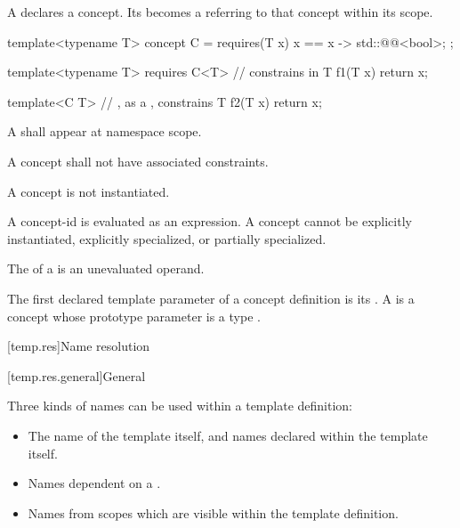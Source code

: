 \pnum
A 
declares a concept.
Its  becomes a 
referring to that concept
within its scope.
\begin{example}
\begin{codeblock}
template<typename T>
concept C = requires(T x) {
  { x == x } -> std::@@<bool>;
};

template<typename T>
  requires C<T>     //  constrains  in 
T f1(T x) { return x; }

template<C T>       // , as a , constrains 
T f2(T x) { return x; }
\end{codeblock}
\end{example}

\pnum
A 
shall appear at namespace scope.

\pnum
A concept shall not have associated constraints.

\pnum
A concept is not instantiated.
\begin{note}
A concept-id is evaluated as an expression.
A concept cannot be
explicitly instantiated,
explicitly specialized,
or partially specialized.
\end{note}

\pnum
The  of a 
is an unevaluated operand.

\pnum
The first declared template parameter of a concept definition is its
.
%
A 
is a concept whose prototype parameter
is a type .

[temp.res]{Name resolution}

[temp.res.general]{General}

\pnum
{}%
%
Three kinds of names can be used within a template definition:

\begin{itemize}
\item
The name of the template itself,
and names declared within the template itself.
\item
Names dependent on a
.
\item
Names from scopes which are visible within the template definition.
\end{itemize}

